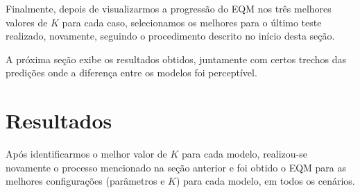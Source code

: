 \documentclass[a4paper, 12pt]{article}
\begin{document}
Finalmente, depois de visualizarmos a progressão do EQM nos três melhores valores de $K$ para cada caso, selecionamos os melhores para o último teste realizado, novamente, seguindo o procedimento descrito no início desta seção.

A próxima seção exibe os resultados obtidos, juntamente com certos trechos das predições onde a diferença entre os modelos foi perceptível.

\section{Resultados}

Após identificarmos o melhor valor de $K$ para cada modelo, realizou-se novamente o processo mencionado na seção anterior e foi obtido o EQM para as melhores configurações (parâmetros e $K$) para cada modelo, em todos os cenários. 
\end{document}
